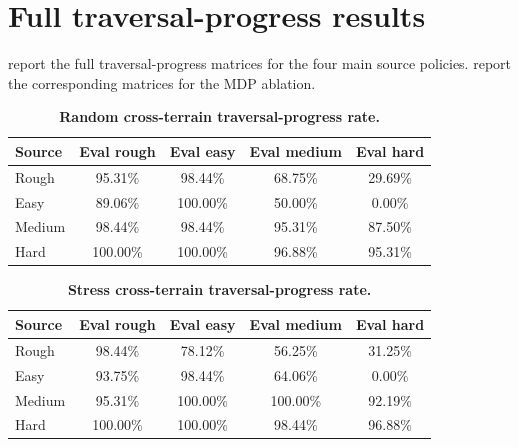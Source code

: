 \documentclass{article}
\begin{document}



\appendix

\section{Full traversal-progress results}
\label{app:progress-results}

 report the full traversal-progress matrices for the four main source policies.  report the corresponding matrices for the MDP ablation.

\begin{table}[h]
    \caption{\textbf{Random cross-terrain traversal-progress rate.}}
    \label{tab:random-cross-progress}
    \centering
    \begin{tabular}{lcccc}
        \toprule
        Source & Eval rough & Eval easy & Eval medium & Eval hard \\
        \midrule
        Rough & 95.31\% & 98.44\% & 68.75\% & 29.69\% \\
        Easy & 89.06\% & 100.00\% & 50.00\% & 0.00\% \\
        Medium & 98.44\% & 98.44\% & 95.31\% & 87.50\% \\
        Hard & 100.00\% & 100.00\% & 96.88\% & 95.31\% \\
        \bottomrule
    \end{tabular}
\end{table}

\begin{table}[h]
    \caption{\textbf{Stress cross-terrain traversal-progress rate.}}
    \label{tab:stress-cross-progress}
    \centering
    \begin{tabular}{lcccc}
        \toprule
        Source & Eval rough & Eval easy & Eval medium & Eval hard \\
        \midrule
        Rough & 98.44\% & 78.12\% & 56.25\% & 31.25\% \\
        Easy & 93.75\% & 98.44\% & 64.06\% & 0.00\% \\
        Medium & 95.31\% & 100.00\% & 100.00\% & 92.19\% \\
        Hard & 100.00\% & 100.00\% & 98.44\% & 96.88\% \\
        \bottomrule
    \end{tabular}
\end{table}
\end{document}
